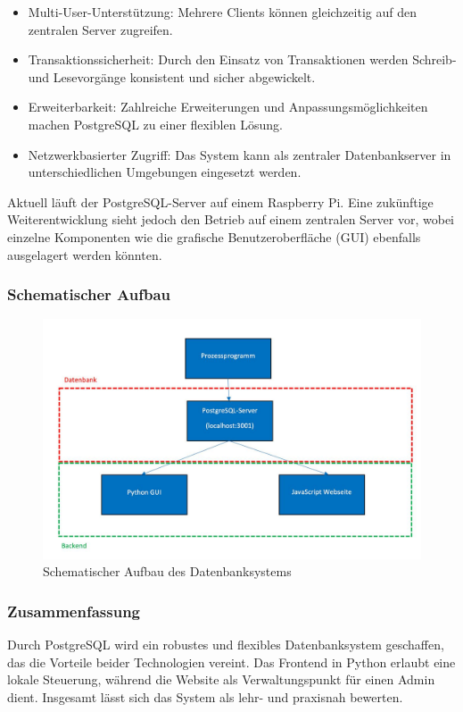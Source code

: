 \begin{itemize}
    \item Multi-User-Unterstützung: Mehrere Clients können gleichzeitig auf den zentralen Server zugreifen.
    \item Transaktionssicherheit: Durch den Einsatz von Transaktionen werden Schreib- und Lesevorgänge konsistent und sicher abgewickelt.
    \item Erweiterbarkeit: Zahlreiche Erweiterungen und Anpassungsmöglichkeiten machen PostgreSQL zu einer flexiblen Lösung.
    \item Netzwerkbasierter Zugriff: Das System kann als zentraler Datenbankserver in unterschiedlichen Umgebungen eingesetzt werden.
\end{itemize}

Aktuell läuft der PostgreSQL-Server auf einem Raspberry Pi. Eine zukünftige Weiterentwicklung sieht jedoch den Betrieb auf einem zentralen Server vor, wobei einzelne Komponenten wie die grafische Benutzeroberfläche (GUI) ebenfalls ausgelagert werden könnten.


\subsubsection{Schematischer Aufbau}
\label{subsubsec:schematischer_aufbau}

\begin{figure}[h]
	\centering
	\includegraphics[width=0.4\linewidth]{figures/Schematischer Aufbau.jpeg}
	\caption[Schematischer Aufbau]{Schematischer Aufbau des Datenbanksystems}\label{fig:schematischer_aufbau}
\end{figure}


\subsubsection{Zusammenfassung}
\label{subsubsec:zusammenfassung}

Durch PostgreSQL wird ein robustes und flexibles Datenbanksystem geschaffen, das die Vorteile beider Technologien vereint. Das Frontend in Python erlaubt eine lokale Steuerung, während die Website als Verwaltungspunkt für einen Admin dient. Insgesamt lässt sich das System als lehr- und praxisnah bewerten.


